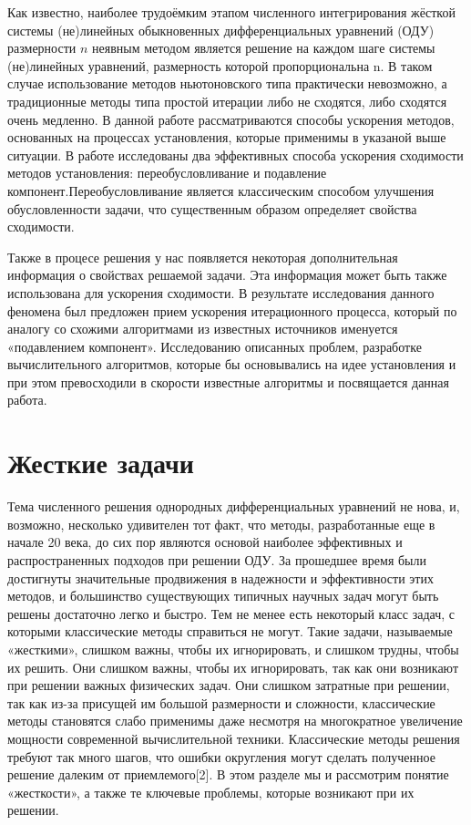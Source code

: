 \documentclass[a4paper,14pt]{extreport}
\begin{document}
Как известно, наиболее трудоёмким этапом численного интегрирования жёсткой системы (не)линейных обыкновенных дифференциальных уравнений (ОДУ) размерности $n$ неявным методом является решение на каждом шаге системы (не)линейных уравнений, размерность которой пропорциональна n. В таком случае использование методов ньютоновского типа практически невозможно, а традиционные методы типа простой итерации либо не сходятся, либо сходятся очень медленно. В данной работе рассматриваются способы ускорения методов, основанных на процессах установления, которые применимы в указаной выше ситуации.
В работе исследованы два эффективных способа ускорения сходимости методов установления: переобусловливание и подавление компонент.Переобусловливание  является классическим способом улучшения обусловленности задачи, что существенным образом определяет свойства сходимости.

Также в процесе решения у нас появляется некоторая дополнительная информация о свойствах решаемой задачи. Эта информация может быть также использована для ускорения сходимости. В результате исследования данного феномена был предложен прием ускорения итерационного процесса, который  по аналогу со схожими алгоритмами из известных источников именуется «подавлением компонент».
Исследованию описанных проблем, разработке вычислительного алгоритмов, которые бы основывались на идее установления и при этом превосходили в скорости известные алгоритмы и посвящается данная работа.
  \label{c:intro}


  \chapter{Жесткие задачи}
  \label{c:stiff_problems}
  Тема численного решения однородных дифференциальных уравнений не нова, и, возможно, несколько удивителен тот факт, что методы, разработанные еще в начале 20 века, до сих пор являются основой наиболее эффективных и распространенных подходов при решении ОДУ. За прошедшее время были достигнуты значительные продвижения в надежности и эффективности этих методов, и большинство существующих типичных научных задач могут быть решены достаточно легко и быстро. Тем не менее есть некоторый класс задач, с которыми классические методы справиться не могут. Такие задачи, называемые «жесткими», слишком важны, чтобы их игнорировать, и слишком трудны, чтобы их решить. Они слишком важны, чтобы их игнорировать, так как они возникают при решении важных физических задач. Они слишком затратные при решении, так как из-за присущей им большой размерности и сложности, классические методы становятся слабо применимы даже несмотря на многократное увеличение мощности современной вычислительной техники. Классические методы решения требуют так много шагов, что ошибки округления могут сделать полученное решение далеким от приемлемого[2]. В этом разделе мы и рассмотрим понятие «жесткости», а также те ключевые проблемы, которые возникают при их решении.
\end{document}
